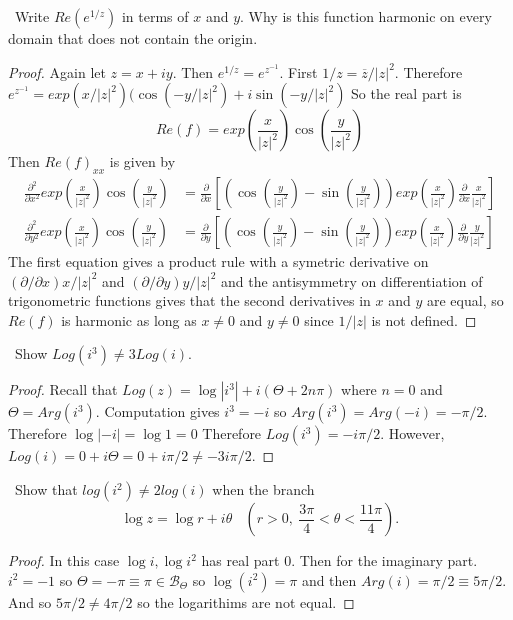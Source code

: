\documentclass[11pt]{amsart}
\theoremstyle{definition}
\numberwithin{theorem}{section}
\numberwithin{definition}{section}
\numberwithin{equation}{section}
\def\scriptb{{\mathcal B}}
\begin{document}
\medskip {}\  Write $Re(e^{1/z})$ in terms of $x$ and $y$. Why is this function harmonic on every domain that does not contain the origin.
\begin{proof}
	Again let $z = x + iy$. Then
		$e^{1/z} = e^{z^{-1}}$. First $1/z = \overline{z}/|z|^2.$ Therefore
		 $e^{z^{-1}} = exp(x/|z|^2)(\cos(-y/|z|^2) +i\sin(-y/|z|^2)$
		 So the real part is 
		 \begin{equation*}
		 	Re(f) = exp\left(\frac{x}{|z|^2}\right) \cos\left(\frac{y}{|z|^2}\right)
		 \end{equation*}
		 Then $Re(f)_{xx}$ is given by
		 	\begin{align}
			\frac{\partial^2}{\partial x^2} exp\left(\frac{x}{|z|^2}\right) \cos\left(\frac{y}{|z|^2}\right) &= \frac{\partial}{\partial x} \left[\left(\cos\left(\frac{y}{|z|^2}\right)-\sin\left(\frac{y}{|z|^2}\right)\right)exp\left(\frac{x}{|z|^2}\right) \frac{\partial}{\partial x}\frac{x}{|z|^2}\right] \\
			\frac{\partial^2}{\partial y^2} exp\left(\frac{x}{|z|^2}\right) \cos\left(\frac{y}{|z|^2}\right) &= \frac{\partial}{\partial y} \left[\left(\cos\left(\frac{y}{|z|^2}\right)-\sin\left(\frac{y}{|z|^2}\right)\right)exp\left(\frac{x}{|z|^2}\right) \frac{\partial}{\partial y} \frac{y}{|z|^2}\right] 	
		 	\end{align}
		 The first equation gives a product rule with a symetric derivative on $(\partial/\partial x) x/|z|^2$ and $(\partial/\partial y)y/|z|^2$  and the antisymmetry on differentiation of trigonometric functions gives that the second derivatives in $x$ and $y$ are equal, so $Re(f)$ is harmonic as long as $x \neq 0$ and $y \neq 0$ since $1/|z|$ is not defined.
\end{proof}


\medskip {}\ Show $Log(i^3) \neq 3 Log(i).$
\begin{proof}
	Recall that $Log(z) = \log |i^3| + i (\Theta + 2n\pi)$ where $n = 0$ and $\Theta = Arg(i^3).$ Computation gives $i^3 = -i$ so $Arg(i^3) = Arg(-i) = -\pi/2.$ Therefore $\log |-i| = \log 1 = 0$ Therefore $Log(i^3) = -i\pi/2$. However, $Log(i) = 0 + i\Theta = 0 + i\pi/2 \neq -3i\pi/2.$
\end{proof}


\medskip {}\ Show that $log(i^2) \neq 2 log(i)$ when the branch
\begin{equation*}
	\log z = \log r + i \theta\ \ \ \ \left(r > 0,\ \frac{3\pi}{4} < \theta < \frac{11\pi}{4}\right).
\end{equation*}
\begin{proof}
	In this case $\log i, \log i^2$ has real part $0$. Then for the imaginary part. $i^2 = -1$ so  $\Theta = -\pi \equiv \pi \in \scriptb_\Theta $ so $\log(i^2) = \pi$ and then $Arg(i) = \pi/2 \equiv 5\pi/2.$ And so $5\pi/2 \neq 4\pi/2$ so the logarithims are not equal.
\end{proof}
\end{document}
